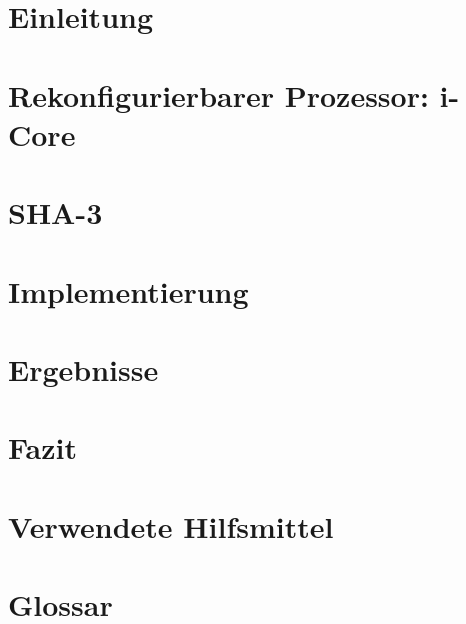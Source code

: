 \renewcommand{\chaptername}{Kapitel}

\chapter{Einleitung}


\chapter{Rekonfigurierbarer Prozessor: i-Core}


\chapter{SHA-3}
\label{cha:sha3}


\chapter{Implementierung}


\newpage

\newpage


\chapter{Ergebnisse}
\label{cha:ergebnisse}


\chapter{Fazit}


\chapter{Verwendete Hilfsmittel}


\chapter{Glossar}

